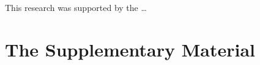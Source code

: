 \documentclass{svjour3}                     %
\begin{document}
\begin{acknowledgements}
  This research was supported by the \dots
\end{acknowledgements}


%
%
\appendix
\setcounter{figure}{0}


\section{The Supplementary Material}\label{sec:app-A}



\end{document}
